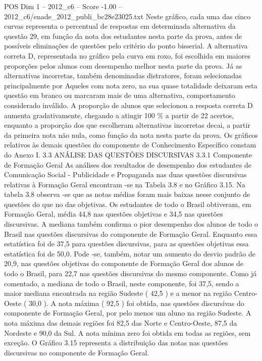 \begin{textsample}{POS Dim 1 – 2012\_c6 – Score -1.00 – 2012\_c6/enade\_2012\_publi\_bc28e23025.txt}
Neste gráfico, cada uma das cinco curvas representa o percentual de respostas em determinada alternativa da questão 29, em função da nota dos estudantes nesta parte da prova, antes de possíveis eliminações de questões pelo critério do ponto bisserial.
A alternativa correta D, representada no gráfico pela curva em roxo, foi escolhida em maiores proporções pelos alunos com desempenho melhor nesta parte da prova.
Já as alternativas incorretas, também denominadas distratores, foram selecionadas principalmente por Aqueles com nota zero, na sua quase totalidade deixaram esta questão em branco ou marcaram mais de uma alternativa, comportamento considerado inválido.
A proporção de alunos que selecionou a resposta correta D aumenta gradativamente, chegando a atingir 100 \% a partir de 22 acertos, enquanto a proporção dos que escolheram alternativas incorretas decai, a partir da primeira nota não nula, como função da nota nesta parte da prova.
Os gráficos relativos às demais questões do componente de Conhecimento Específico constam do Anexo I. 3.3 ANÁLISE DAS QUESTÕES DISCURSIVAS 3.3.1 Componente de Formação Geral As análises dos resultados de desempenho dos estudantes de Comunicação Social - Publicidade e Propaganda nas duas questões discursivas relativas à Formação Geral encontram -se na Tabela 3.8 e no Gráfico 3.15.
Na tabela 3.8 observa -se que as notas médias foram mais baixas nesse conjunto de questões do que no das objetivas.
Os estudantes de todo o Brasil obtiveram, em Formação Geral, média 44,8 nas questões objetivas e 34,5 nas questões discursivas.
A mediana também confirma o pior desempenho dos alunos de todo o Brasil nas questões discursivas do componente de Formação Geral.
Enquanto essa estatística foi de 37,5 para questões discursivas, para as questões objetivas essa estatística foi de 50,0.
Pode -se, também, notar um aumento do desvio padrão de 20,9, nas questões objetivas do componente de Formação Geral dos alunos de todo o Brasil, para 22,7 nas questões discursivas do mesmo componente.
Como já comentado, a mediana de todo o Brasil, neste componente, foi 37,5, sendo a maior mediana encontrada na região Sudeste ( 42,5 ) e a menor na região Centro-Oeste ( 30,0 ).
A nota máxima ( 92,5 ) foi obtida, nas questões discursivas do componente de Formação Geral, por pelo menos um aluno na região Sudeste.
A nota máxima das demais regiões foi 82,5 das Norte e Centro-Oeste, 87,5 da Nordeste e 90,0 da Sul.
A nota mínima zero foi obtida em todas as regiões, sem exceção.
O Gráfico 3.15 representa a distribuição das notas nas questões discursivas no componente de Formação Geral.

\end{textsample}
